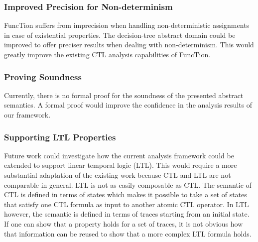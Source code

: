 \documentclass[11pt,a4paper,titlepage]{article}
\theoremstyle{definition}
\begin{document}
\subsubsection*{Improved Precision for Non-determinism}
FuncTion suffers from imprecision when handling non-deterministic assignments in case of existential properties.
The decision-tree abstract domain could be improved to offer preciser results when dealing with non-determinism. 
This would greatly improve the existing CTL analysis capabilities of FuncTion.

\subsubsection*{Proving Soundness}
Currently, there is no formal proof for the soundness of the presented abstract semantics. 
A formal proof would improve the confidence in the analysis results of our framework.

\subsubsection*{Supporting LTL Properties}
Future work could investigate how the current analysis framework could be extended to support linear temporal logic (LTL). 
This would require a more substantial adaptation of the existing work because CTL and LTL are not comparable in general.
LTL is not as easily composable as CTL. The semantic of CTL is defined in terms of states which makes it possible 
to take a set of states that satisfy one CTL formula as input to another atomic CTL operator.
In LTL however, the semantic is defined in terms of traces starting from an initial state. 
If one can show that a property holds for a set of traces, 
it is not obvious how that information can be reused to show that a more complex LTL formula holds.



\pagebreak



\end{document}
